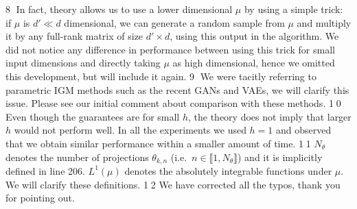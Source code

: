 \documentclass{article}
\newcommand{\rev}[1]{{\color{red} #1}}
\newcommand{\umut}[1]{{\color{blue} #1}}
\newcommand{\alain}[1]{{\color{cyan} #1}}
\newcommand{\antoine}[1]{{\color{orange} #1}}
\newcommand{\ubul}[1]{{\large \color{red} \textcircled{\small #1}}}
\begin{document}
%
%
\ubul{8} In fact, theory allows us to use a lower dimensional $\mu$ by using
a simple trick: if $\mu$ is $d' \ll d$ dimensional, we can generate a random sample from $\mu$ and multiply it by any full-rank matrix of size $d' \times d$, using this output in the algorithm. We did not notice any difference in performance between using this trick for small input dimensions and directly taking $\mu$ as high dimensional, hence we omitted this development, but will include it again.
%
%
\ubul{9} We were tacitly referring to parametric IGM methods such as the recent GANs and VAEs, we will clarify this issue. Please see our initial comment about comparison with these methods.
%
%
\ubul{10} Even though the guarantees are for small $h$, the theory does not imply that larger $h$ would not perform well. In all the experiments we used $h=1$ and observed that we obtain similar performance within a smaller amount of time.
%
\ubul{11} $N_\theta$ denotes the number of projections $\theta_{k,n}$ (i.e.\ $n \in \llbracket 1, N_\theta \rrbracket$) and it is implicitly defined in line 206. $L^1(\mu)$ denotes the absolutely integrable functions under $\mu$. We will clarify these definitions.
%
%
\ubul{12} We have corrected all the typos, thank you for pointing out.
\end{document}

